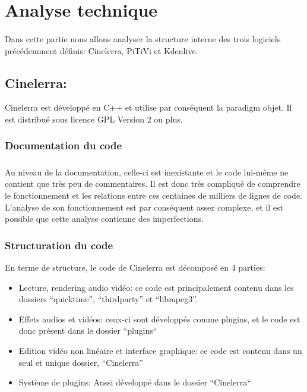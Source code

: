 \newpage \section{Analyse technique}

\paragraph {}

Dans cette partie nous allons analyser la structure interne des trois
logiciels précédemment définis: Cinelerra, PiTiVi et Kdenlive.

\subsection{Cinelerra:}

Cinelerra est développé en C++ et utilise par conséquent la paradigm
objet.  Il est distribué sous licence GPL Version 2 ou plus.

\subsubsection{Documentation du code}

\subparagraph{}

Au niveau de la documentation, celle-ci est inexistante et le code
lui-même ne contient que très peu de commentaires. Il est donc très
compliqué de comprendre le fonctionnement et les relations entre ces
centaines de milliers de lignes de code. L'analyse de son fonctionnement
est par conséquent assez complexe, et il est possible que cette analyse
contienne des imperfections.

\subsubsection {Structuration du code}

En terme de structure, le code de Cinelerra est décomposé en 4 parties:

\begin{itemize}

  \item{Lecture, rendering  audio vidéo: ce code est principalement
    contenu dans les dossiers ``quicktime'', ``thirdparty'' et
    ``libmpeg3''.}

  \item{Effets audios et vidéos: ceux-ci sont développés comme plugins,
    et le code est donc présent dans le dossier ``plugins`` }

  \item{Edition vidéo non linéaire et interface graphique: ce code est
    contenu dans un seul et unique dossier, ``Cinelerra''}

  \item{Système de plugins: Aussi développé dans le dossier
  ``Cinelerra``}

\end{itemize}

